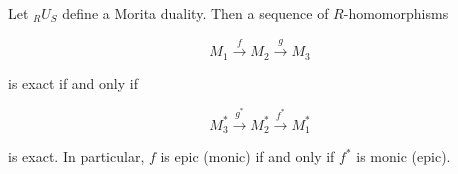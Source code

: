 Let ${}_R U_S$ define a Morita duality. Then a sequence of $R$-homomorphisms

$$M_1 \xrightarrow{f} M_2 \xrightarrow{g} M_3$$

is exact if and only if

$$M_3^* \xrightarrow{g^*} M_2^* \xrightarrow{f^*} M_1^*$$

is exact. In particular, $f$ is epic (monic) if and only if $f^*$ is monic (epic).
